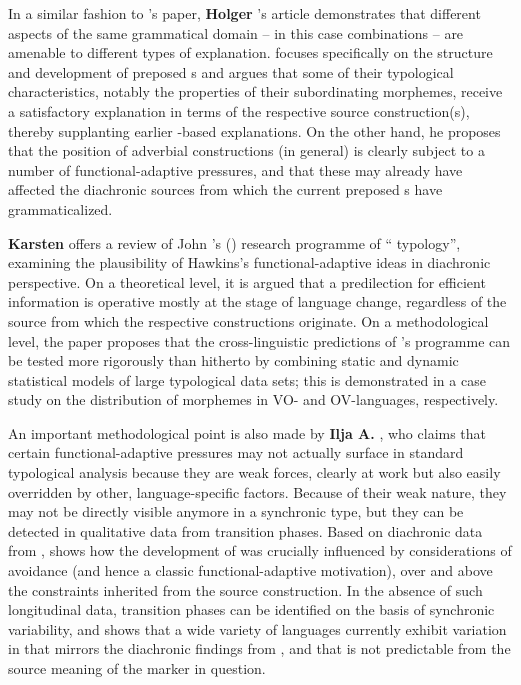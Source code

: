 \documentclass[output=paper]{langsci/langscibook}
\begin{document}
In a similar fashion to ’s paper, \textbf{Holger }’s article demonstrates that different aspects of the same grammatical domain – in this case  combinations – are amenable to different types of explanation.  focuses specifically on the structure and development of preposed s and argues that some of their typological characteristics, notably the properties of their subordinating morphemes, receive a satisfactory explanation in terms of the respective source construction(s), thereby supplanting earlier -based explanations. On the other hand, he proposes that the position of adverbial constructions (in general) is clearly subject to a number of functional-adaptive pressures, and that these may already have affected the diachronic sources from which the current preposed s have grammaticalized.

\textbf{Karsten } offers a review of John 's (\citeyear{Hawkins2004,Hawkins2014_VarEff}) research programme of “ typology”, examining the plausibility of Hawkins’s functional-adaptive ideas in diachronic perspective. On a theoretical level, it is argued that a predilection for efficient information  is operative mostly at the  stage of language change, regardless of the source from which the respective constructions originate. On a methodological level, the paper proposes that the cross-linguistic predictions of ’s programme can be tested more rigorously than hitherto by combining static and dynamic statistical models of large typological data sets; this is demonstrated in a case study on the distribution of  morphemes in VO- and OV-languages, respectively.

An important methodological point is also made by \textbf{Ilja A. }, who claims that certain functional-adaptive pressures may not actually surface in standard typological analysis because they are weak forces, clearly at work but also easily overridden by other, language-specific factors. Because of their weak nature, they may not be directly visible anymore in a synchronic type, but they can be detected in qualitative data from transition phases. Based on diachronic data from ,  shows how the development of  was crucially influenced by considerations of  avoidance (and hence a classic functional-adaptive motivation), over and above the constraints inherited from the source construction. In the absence of such longitudinal data, transition phases can be identified on the basis of synchronic variability, and  shows that a wide variety of languages currently exhibit variation in  that mirrors the diachronic findings from , and that is not predictable from the source meaning of the marker in question.
\end{document}
